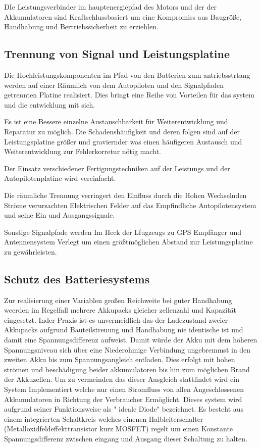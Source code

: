 DIe Leistungsverbinder im hauptenergiepfad des Motors und der der Akkumulatoren sind Kraftschlussbasiert um eine Kompromiss aus Baugröße, Handhabung und Bertriebssicherheit zu erziehlen.

\subsection{Trennung von Signal und Leistungsplatine}

Die  Hochleistungskomponenten im Pfad von den Batterien zum antriebsstrtang werden auf einer Räumlich von dem Autopiloten und den Signalpfaden getrennten Platine realisiert. Dies bringt eine Reihe von Vorteilen für das system und die entwicklung mit sich.

Es ist eine Bessere einzelne Austauschbarkeit für Weiterentwicklung und Reparatur zu möglich.
Die Schadenshäufigkeit und deren folgen sind auf der Leistungsplatine größer und graviernder was einen häufigeren 
Austausch und Weiterentwicklung zur Fehlerkorretur nötig macht.

Der Einsatz verschiedener Fertigungstechniken auf der Leistungs und der Autopilotenplatine wird vereinfacht.

Die räumliche Trennung verringert den Einfluss durch die Hohen Wechselnden Ströme verursachten Elektrischen Felder auf das Empfindliche Autopilotensystem und seine Ein und Ausgangssignale.

Sonstige Signalpfade werden Im Heck der Lfugzeugs zu GPS Empfänger und Antennensystem Verlegt um einen größtmöglichen Abstand zur Leistungsplatine zu gewährleisten.

\subsection{Schutz des Batteriesystems}

Zur realisierung einer Variablen großen Reichweite bei guter Handhabung weerden im Regelfall mehrere Akkupacks gleicher zellenzahl und Kapazität eingesetzt.
Inder Praxis ist es unvermeidlich das der Ladezustand zweier Akkupacks aufgrund Bauteilstreuung und Handhabung nie identische ist und damit eine Spannungsdifferenz aufweist. Damit würde der Akku mit dem höheren Spannungsniveau sich über eine Niederohmige Verbindung ungebremmst in den zweiten Akku bis zum Spannungsangleich entladen. Dies erfolgt mit  hohen strömen und beschädigung beider akkumulatoren bis hin zum möglichen Brand der Akkuzellen.
Um zu vermeinden das dieser Ausgleich stattfindet wird ein System Implementiert welche nur einen Stromfluss von allen Angeschlossenen Akkumulatoren in Richtung der Verbraucher Ermöglicht.
Dieses system wird aufgrund seiner Funktionsweise als " ideale Diode" bezeichnet. Es besteht aus einem integrierten Schaltkreis welches einenen Halbleiterschalter (Metalloxidfeldeffekttransistor kurz MOSFET) regelt um einen Konstante Spannungsdifferenz zwischen eingang und Ausgang dieser Schaltung zu halten.

